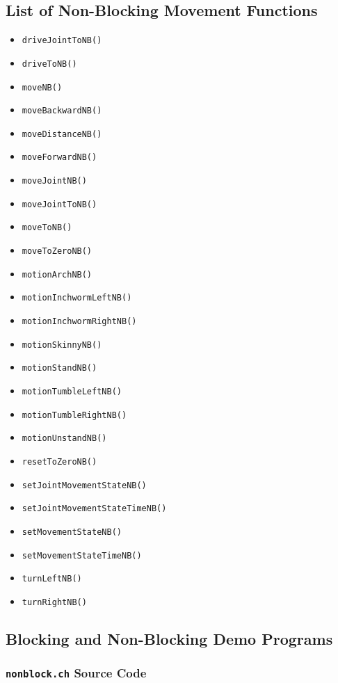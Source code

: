 \documentclass{article}
\begin{document}
\subsection{List of Non-Blocking Movement Functions}
\begin{itemize}
\item \texttt{driveJointToNB()}
\item \texttt{driveToNB()}
\item \texttt{moveNB()}
\item \texttt{moveBackwardNB()}
\item \texttt{moveDistanceNB()}
\item \texttt{moveForwardNB()}
\item \texttt{moveJointNB()}
\item \texttt{moveJointToNB()}
\item \texttt{moveToNB()}
\item \texttt{moveToZeroNB()}
\item \texttt{motionArchNB()}
\item \texttt{motionInchwormLeftNB()}
\item \texttt{motionInchwormRightNB()}
\item \texttt{motionSkinnyNB()}
\item \texttt{motionStandNB()}
\item \texttt{motionTumbleLeftNB()}
\item \texttt{motionTumbleRightNB()}
\item \texttt{motionUnstandNB()}
\item \texttt{resetToZeroNB()}
\item \texttt{setJointMovementStateNB()}
\item \texttt{setJointMovementStateTimeNB()}
\item \texttt{setMovementStateNB()}
\item \texttt{setMovementStateTimeNB()}
\item \texttt{turnLeftNB()}
\item \texttt{turnRightNB()}
\end{itemize}

\subsection{Blocking and Non-Blocking Demo Programs}
\subsubsection{\texttt{nonblock.ch} Source Code}

\end{document}

